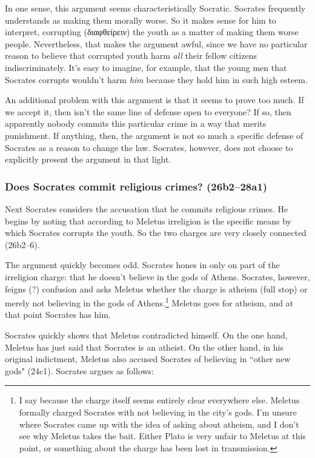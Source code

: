 \documentclass[11pt]{article}
\begin{document}
In one sense, this argument seems characteristically Socratic.  Socrates frequently understands  as making them morally worse.  So it makes sense for him to interpret, corrupting (διαφθείρειν) the youth as a matter of making them worse people.  Nevertheless, that makes the argument awful, since we have no particular reason to believe that corrupted youth harm \emph{all} their fellow citizens indiscriminately.  It's easy to imagine, for example, that the young men that Socrates corrupts wouldn't harm \emph{him} because they hold him in such high esteem.

An additional problem with this argument is that it seems to prove too much.  If we accept it, then isn't the same line of defense open to everyone?  If so, then apparently nobody commits this particular crime in a way that merits punishment.  If anything, then, the argument is not so much a specific defense of Socrates as a reason to change the law.  Socrates, however, does not choose to explicitly present the argument in that light.

\subsubsection{Does Socrates commit religious crimes? (26b2--28a1)}

Next Socrates considers the accusation that he commits religious crimes.  He begins by noting that according to Meletus irreligion is the specific means by which Socrates corrupts the youth.  So the two charges are very closely connected (26b2--6).

The argument quickly becomes odd. Socrates hones in only on part of the irreligion charge: that he doesn't believe in the gods of Athens.  Socrates, however, feigns (?) confusion and asks Meletus whether the charge is atheism (full stop) or merely not believing in the gods of Athens.\footnote{I say  because the charge itself seems entirely clear everywhere else.  Meletus formally charged Socrates with not believing in the city's gods.  I'm unsure where Socrates came up with the idea of asking about atheism, and I don't see why Meletus takes the bait.  Either Plato is very unfair to Meletus at this point, or something about the charge has been lost in transmission.}  Meletus goes for atheism, and at that point Socrates has him.

Socrates quickly shows that Meletus contradicted himself.  On the one hand, Meletus has just said that Socrates is an atheist.  On the other hand, in his original indictment, Meletus also accused Socrates of believing in ``other new gods" (24c1).  Socrates argues as follows:
\end{document}
